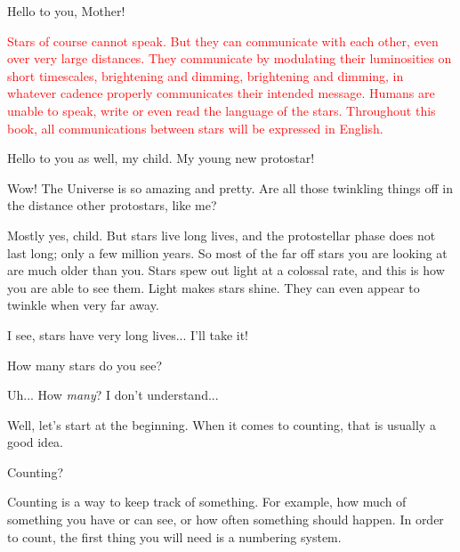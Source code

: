 \documentclass[main.tex]{subfiles}
\begin{document}
\par \Maia Hello to you, Mother!

\begin{tcolorbox}[sharp corners, colback=red!30, colframe=red!80!blue, title=Stellar Communication]
\par \textcolor{red} {Stars of course cannot speak.  But they can communicate with each other, even over very large distances.  They communicate by modulating their luminosities on short timescales, brightening and dimming, brightening and dimming, in whatever cadence properly communicates their intended message.  Humans are unable to speak, write or even read the language of the stars.  Throughout this book, all communications between stars will be expressed in English.} 
\end{tcolorbox}

\par \Pleione Hello to you as well, my child.  My young new protostar!

\par \Maia Wow!  The Universe is so amazing and pretty.  Are all those twinkling things off in the distance other protostars, like me?

\par \Pleione Mostly yes, child.  But stars live long lives, and the protostellar phase does not last long; only a few million years.  So most of the far off stars you are looking at are much older than you.  Stars spew out light at a colossal rate, and this is how you are able to see them.  Light makes stars shine.  They can even appear to twinkle when very far away.

\par \Maia I see, stars have very long lives...  I'll take it!  

\par \Pleione How many stars do you see?

\par \Maia Uh... How \textit{many}?  I don't understand...

\par \Pleione Well, let's start at the beginning.  When it comes to counting, that is usually a good idea.

\par \Maia Counting?

\par \Pleione  Counting is a way to keep track of something.  For example, how much of something you have or can see, or how often something should happen.  In order to count, the first thing you will need is a numbering system.
\end{document}
